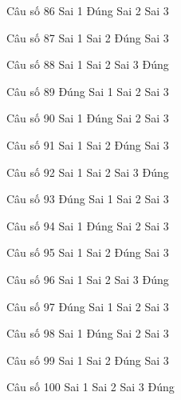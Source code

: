 \begin{ex}
Câu số 86
\choice
{Sai 1}
{\True Đúng}
{Sai 2}
{Sai 3}
\end{ex}

\begin{ex}
Câu số 87
\choice
{Sai 1}
{Sai 2}
{\True Đúng}
{Sai 3}
\end{ex}

\begin{ex}
Câu số 88
\choice
{Sai 1}
{Sai 2}
{Sai 3}
{\True Đúng}
\end{ex}
\begin{ex}
Câu số 89
\choice
{\True Đúng}
{Sai 1}
{Sai 2}
{Sai 3}
\end{ex}

\begin{ex}
Câu số 90
\choice
{Sai 1}
{\True Đúng}
{Sai 2}
{Sai 3}
\end{ex}

\begin{ex}
Câu số 91
\choice
{Sai 1}
{Sai 2}
{\True Đúng}
{Sai 3}
\end{ex}

\begin{ex}
Câu số 92
\choice
{Sai 1}
{Sai 2}
{Sai 3}
{\True Đúng}
\end{ex}
\begin{ex}
Câu số 93
\choice
{\True Đúng}
{Sai 1}
{Sai 2}
{Sai 3}
\end{ex}

\begin{ex}
Câu số 94
\choice
{Sai 1}
{\True Đúng}
{Sai 2}
{Sai 3}
\end{ex}

\begin{ex}
Câu số 95
\choice
{Sai 1}
{Sai 2}
{\True Đúng}
{Sai 3}
\end{ex}

\begin{ex}
Câu số 96
\choice
{Sai 1}
{Sai 2}
{Sai 3}
{\True Đúng}
\end{ex}
\begin{ex}
Câu số 97
\choice
{\True Đúng}
{Sai 1}
{Sai 2}
{Sai 3}
\end{ex}

\begin{ex}
Câu số 98
\choice
{Sai 1}
{\True Đúng}
{Sai 2}
{Sai 3}
\end{ex}

\begin{ex}
Câu số 99
\choice
{Sai 1}
{Sai 2}
{\True Đúng}
{Sai 3}
\end{ex}

\begin{ex}
Câu số 100
\choice
{Sai 1}
{Sai 2}
{Sai 3}
{\True Đúng}
\end{ex}

